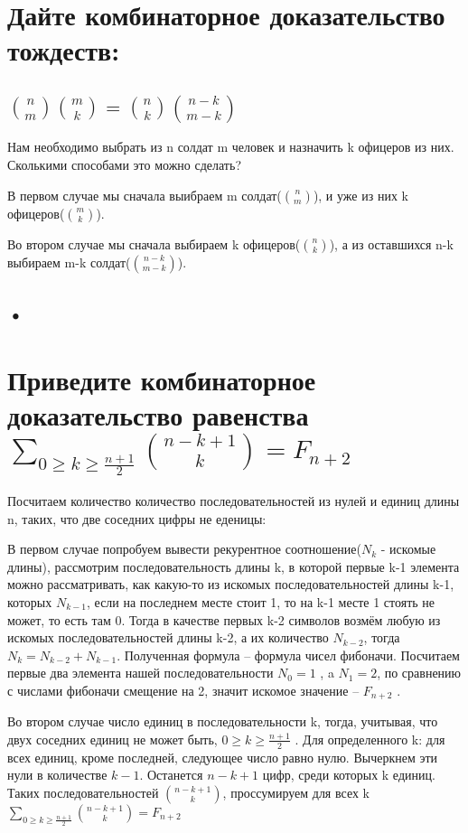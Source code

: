 \documentclass[a4paper,11pt]{article}
\begin{document}
\section{Дайте комбинаторное доказательство тождеств:}

\subsection{${n \choose m}{m \choose k}={n \choose k}{n-k \choose m-k}$} 

Нам необходимо выбрать из n солдат m человек и назначить k офицеров из них. Сколькими способами это можно сделать?

В первом случае мы сначала выибраем m солдат(${n \choose m}$), и уже из них k офицеров(${m \choose k}$).

Во втором случае мы сначала выбираем k офицеров(${n \choose k}$), а из оставшихся n-k выбираем m-k солдат(${n-k \choose m-k}$).

\subsection{•}

\section{Приведите комбинаторное доказательство равенства $\sum\limits_{0 \geq k \geq \frac{n+1}{2}}{n -k + 1 \choose k} = F_{n+2}$}

Посчитаем количество количество последовательностей из нулей и единиц длины n, таких, что две соседних цифры не еденицы:

В первом случае попробуем вывести рекурентное соотношение($N_k$ - искомые длины), рассмотрим последовательность длины k, в которой первые k-1 элемента можно рассматривать, как какую-то из искомых последовательностей длины k-1, которых $N_{k-1}$, если на последнем месте стоит 1, то на k-1 месте 1 стоять не может, то есть там 0. Тогда в качестве первых k-2 символов возмём любую из искомых последовательностей длины k-2, а их количество $N_{k-2}$, тогда $N_{k} = N_{k-2} + N_{k-1}$. Полученная формула -- формула чисел фибоначи. Посчитаем первые два элемента нашей последовательности $N_{0} = 1$ , a $N_{1} = 2$, по сравнению с числами фибоначи смещение на 2, значит искомое значение -- $F_{n+2}$ .

Во втором случае число единиц в последовательности k, тогда, учитывая, что двух соседних единиц не может быть, $0 \geq k \geq \frac{n+1}{2}$ . Для определенного k: для всех единиц, кроме последней, следующее число равно нулю. Вычеркнем эти нули в количестве $k-1$. Останется $n-k+1$ цифр, среди которых k единиц. Таких последовательностей ${n -k + 1 \choose k}$, проссумируем для всех k $\sum\limits_{0 \geq k \geq \frac{n+1}{2}}{n -k + 1 \choose k} = F_{n+2}$
\end{document}

